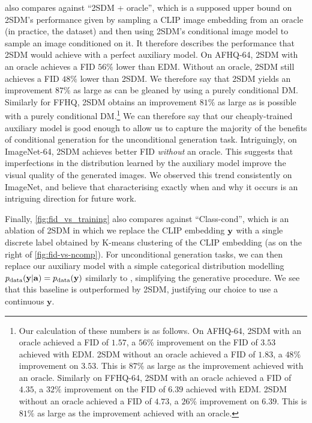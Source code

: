  also compares against ``2SDM + oracle'', which is a supposed upper bound on 2SDM's performance given by sampling a CLIP image embedding from an oracle (in practice, the dataset) and then using 2SDM's conditional image model to sample an image conditioned on it. It therefore describes the performance that 2SDM would achieve with a perfect auxiliary model. On AFHQ-64, 2SDM with an oracle achieves a FID $56\%$ lower than EDM. Without an oracle, 2SDM still achieves a FID $48\%$ lower than 2SDM. We therefore say that 2SDM yields an improvement $87\%$ as large as can be gleaned by using a purely conditional DM. Similarly for FFHQ, 2SDM obtains an improvement $81\%$ as large as is possible with a purely conditional DM.\footnote{Our calculation of these numbers is as follows. On AFHQ-64, 2SDM with an oracle achieved a FID of $1.57$, a $56\%$ improvement on the FID of $3.53$ achieved with EDM. 2SDM without an oracle achieved a FID of $1.83$, a $48\%$ improvement on $3.53$. This is $87\%$ as large as the improvement achieved with an oracle. Similarly on FFHQ-64, 2SDM with an oracle achieved a FID of $4.35$, a $32\%$ improvement on the FID of $6.39$ achieved with EDM. 2SDM without an oracle achieved a FID of $4.73$, a $26\%$ improvement on $6.39$. This is $81\%$ as large as the improvement achieved with an oracle.} We can therefore say that our cheaply-trained auxiliary model is good enough to allow us to capture the majority of the benefits of conditional generation for the unconditional generation task. Intriguingly,
 on ImageNet-64, 2SDM achieves better FID \textit{without} an oracle. This suggests that imperfections in the distribution
learned by the auxiliary model improve the visual quality of the generated images. We observed this trend consistently on ImageNet, and believe that characterising exactly when and why it occurs is an intriguing direction for future work.

Finally, \cref{fig:fid_vs_training} also compares against ``Class-cond'', which is an ablation of 2SDM in which we replace the CLIP embedding ${\mathbf{y}}$ with a single discrete label obtained by K-means clustering of the CLIP embedding (as on the right of \cref{fig:fid-vs-ncomp}). For unconditional generation tasks, we can then replace our auxiliary model with a simple categorical distribution modelling $p_{\rm{data}}({\mathbf{y}}|{\mathbf{a}})=p_{\rm{data}}({\mathbf{y}})$ similarly to \citet{hu2022self}, simplifying the generative procedure. We see that this baseline is outperformed by 2SDM, justifying our choice to use a continuous $\mathbf{y}$.

